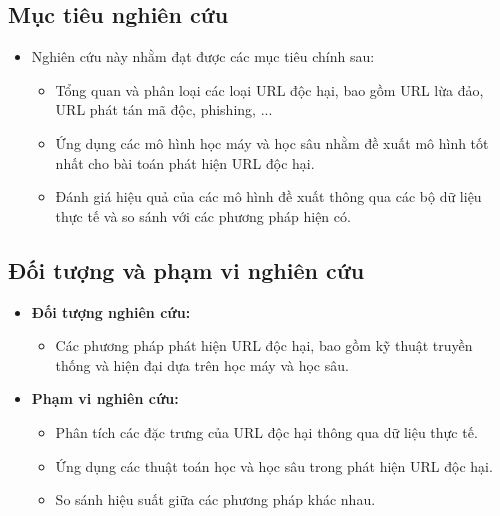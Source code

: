 \documentclass[13pt]{article}
\begin{document}
    \subsection{Mục tiêu nghiên cứu}
\begin{itemize}
    \item Nghiên cứu này nhằm đạt được các mục tiêu chính sau:
    \begin{itemize}
        \item Tổng quan và phân loại các loại URL độc hại, bao gồm URL lừa đảo, URL phát tán mã độc, phishing, ...
        \item Ứng dụng các mô hình học máy và học sâu nhằm đề xuất mô hình tốt nhất cho bài toán phát hiện URL độc hại.
        \item Đánh giá hiệu quả của các mô hình đề xuất thông qua các bộ dữ liệu thực tế và so sánh với các phương pháp hiện có.
    \end{itemize}
\end{itemize}

    \subsection{Đối tượng và phạm vi nghiên cứu}
\begin{itemize}
    \item \textbf{Đối tượng nghiên cứu:}
    \begin{itemize}
        \item Các phương pháp phát hiện URL độc hại, bao gồm kỹ thuật truyền thống và hiện đại dựa trên học máy và học sâu.
    \end{itemize}
    
    \item \textbf{Phạm vi nghiên cứu:}
    \begin{itemize}
        \item Phân tích các đặc trưng của URL độc hại thông qua dữ liệu thực tế.
        \item Ứng dụng các thuật toán học và học sâu trong phát hiện URL độc hại.
        \item So sánh hiệu suất giữa các phương pháp khác nhau.
    \end{itemize}
\end{itemize}
\end{document}
